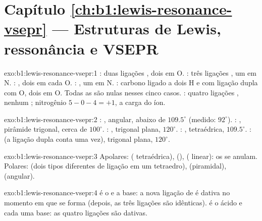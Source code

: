 \section*{Capítulo \ref{ch:b1:lewis-resonance-vsepr} --- Estruturas de Lewis, ressonância e VSEPR}

\begin{solution}{exo:b1:lewis-resonance-vsepr:1}
: duas ligações , dois  em O. :
três ligações , um  em N. : ,
dois  em cada O. : , um  em N. : carbono ligado a dois H e com ligação dupla com
O, dois  em O. Todas as  são nulas nesses
cinco casos. : quatro ligações , nenhum ;
nitrogênio $5 - 0 - 4 = +1$, a carga do íon.
\end{solution}

\begin{solution}{exo:b1:lewis-resonance-vsepr:2}
: , angular, abaixo de $109.5^\circ$ (medido: $92^\circ$).
: , pirâmide trigonal, cerca de $100^\circ$.
: , trigonal plana, $120^\circ$. : ,
tetraédrica, $109.5^\circ$. :  (a ligação dupla
conta uma vez), trigonal plana, $120^\circ$.
\end{solution}

\begin{solution}{exo:b1:lewis-resonance-vsepr:3}
Apolares:  ( tetraédrica),  (),
 ( linear): os  se anulam. Polares:
 (dois tipos diferentes de ligação em um tetraedro), 
(piramidal),  (angular).
\end{solution}

\begin{solution}{exo:b1:lewis-resonance-vsepr:4}
 é o  e  a base: a nova ligação  de
 é dativa no momento em que se forma (depois, as três ligações
 são idênticas).  é o ácido e cada  uma base:
as quatro ligações  são dativas.
\end{solution}

